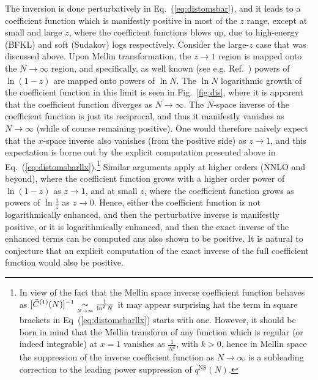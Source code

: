 The
inversion is done perturbatively in Eq.~(\ref{eq:distomsbar}), and it
leads to a coefficient function which is manifestly positive in most
of the $z$ range, except at small and large $z$, where the coefficient
functions blows up, due to high-energy (BFKL) and soft (Sudakov) logs
respectively. Consider the large-$z$ case that was discussed
above. Upon 
Mellin transformation, the $z\to 1$ region is mapped onto the
$N\to\infty$ region, and specifically, as well known (see
e.g. Ref.~\cite{Forte:2002ni}) powers of $\ln(1-z)$ are mapped onto
powers of $\ln N$.  
The $\ln N$ logarithmic growth of the coefficient function in this limit is
seen in Fig.~\ref{fig:dis}, where it is apparent that the coefficient function
diverges as $N\to\infty$. The $N$-space inverse of the coefficient function is
just its reciprocal, and thus it manifestly vanishes as $N\to\infty$ (while of
course remaining positive).
One would therefore naively expect that the $x$-space inverse also vanishes
(from the positive side) as $z\to1$, and this expectation is borne out by the
explicit computation presented above in
Eq.~(\ref{eq:distomsbarllx}).\footnote{
  In view of the fact that the Mellin space inverse coefficient function
  behaves as $[\bar C^{(1)}(N)]^{-1}\mathrel{\mathop{\sim}\limits_{\scriptscriptstyle {N\rightarrow\infty }}}\frac{1}{\ln^2 N}$ it may appear
  surprising hat the term in square brackets in Eq~(\ref{eq:distomsbarllx})
  starts with one. However, it should be born in mind that the Mellin transform
  of any function which is regular (or indeed integrable) at $x=1$ vanishes as
  $\frac{1}{N^k}$, with $k>0$, hence in Mellin space the suppression of the
  inverse coefficient function as $N\to\infty$ is a subleading correction to
  the leading power suppression of $q^{\textrm{NS}}(N)$.
}
Similar arguments apply at higher orders (NNLO and beyond), where the
coefficient function grows with a higher order power of $\ln(1-z)$ as $z\to1$,
and at small $z$, where the coefficient function grows as powers of $\ln
\frac{1}{z}$ as $z\to0$.
Hence, either the coefficient function is not logarithmically enhanced, and
then the perturbative inverse is manifestly positive, or it is logarithmically
enhanced, and then the exact inverse of the enhanced terms can be computed ans
also shown to be positive.
It is natural to conjecture that an explicit computation of the exact inverse
of the full coefficient function would also be positive.

